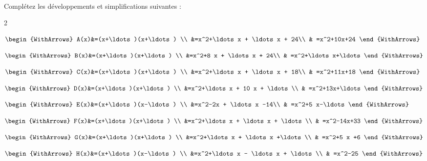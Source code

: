 \documentclass[main.tex]{subfiles}
\begin{document}
\begin{exercise}  Complétez les développements et simplifications suivantes :


\begin{spacing}{2}
	\noindent
	\parbox{0.48\linewidth}{
		$\begin{WithArrows}
			A(x)&=(x+\ldots)(x+\ldots) \\
			&=x^2+\ldots x + \ldots x + 24\\
			& =x^2+10x+24
		\end{WithArrows}$
	}
	\hfill
	\parbox{0.48\linewidth}{
		$\begin{WithArrows}
			B(x)&=(x+\ldots)(x+\ldots) \\
			&=x^2+8 x + \ldots x + 24\\
			& =x^2+\ldots x+\ldots
		\end{WithArrows}$
	}
	
	
	\noindent
	\parbox{0.48\linewidth}{
		$\begin{WithArrows}
			C(x)&=(x+\ldots)(x+\ldots) \\
			&=x^2+\ldots x + \ldots x + 18\\
			& =x^2+11x+18
		\end{WithArrows}$
	}	
	\hfill
	\parbox{0.48\linewidth}{
		$\begin{WithArrows}
			D(x)&=(x+\ldots)(x+\ldots) \\
			&=x^2+\ldots x + 10 x + \ldots \\
			& =x^2+13x+\ldots
		\end{WithArrows}$
	}
	
	\noindent
	\parbox{0.48\linewidth}{
		$\begin{WithArrows}
			E(x)&=(x+\ldots)(x-\ldots) \\
			&=x^2-2x + \ldots x -14\\
			& =x^2+5 x-\ldots
		\end{WithArrows}$
	}
	\hfill
	\parbox{0.48\linewidth}{
		$\begin{WithArrows}
			F(x)&=(x+\ldots)(x+\ldots) \\
			&=x^2+\ldots x + \ldots x + \ldots\\
			& =x^2-14x+33
		\end{WithArrows}$
	} 

	\noindent
\parbox{0.48\linewidth}{
	$\begin{WithArrows}
		G(x)&=(x+\ldots)(x+\ldots) \\
		&=x^2+\ldots x + \ldots x +\ldots\\
		& =x^2+5 x +6
	\end{WithArrows}$
}
\hfill
\parbox{0.48\linewidth}{
	$\begin{WithArrows}
		H(x)&=(x+\ldots)(x-\ldots) \\
		&=x^2+\ldots x - \ldots x + \ldots\\
		& =x^2-25
	\end{WithArrows}$
} 
\end{spacing}
\end{exercise}
\end{document}
